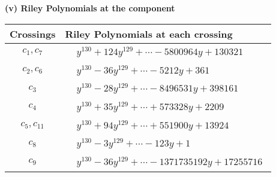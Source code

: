 \documentclass[1p]{elsarticle_modified}
\theoremstyle{definition}
\begin{document}
\newpage\renewcommand{\arraystretch}{1}
\flushleft \textbf{(v) Riley Polynomials at the component}\newline \\
\begin{tabular}{m{50pt}|m{274pt}}
Crossings & \hspace{64pt}Riley Polynomials at each crossing \\
\hline $$\begin{aligned}c_{1},c_{7}\end{aligned}$$&$\begin{aligned}
&y^{130}+124 y^{129}+\cdots-5800964 y+130321
\end{aligned}$\\
\hline $$\begin{aligned}c_{2},c_{6}\end{aligned}$$&$\begin{aligned}
&y^{130}-36 y^{129}+\cdots-5212 y+361
\end{aligned}$\\
\hline $$\begin{aligned}c_{3}\end{aligned}$$&$\begin{aligned}
&y^{130}-28 y^{129}+\cdots-8496531 y+398161
\end{aligned}$\\
\hline $$\begin{aligned}c_{4}\end{aligned}$$&$\begin{aligned}
&y^{130}+35 y^{129}+\cdots+573328 y+2209
\end{aligned}$\\
\hline $$\begin{aligned}c_{5},c_{11}\end{aligned}$$&$\begin{aligned}
&y^{130}+94 y^{129}+\cdots+551900 y+13924
\end{aligned}$\\
\hline $$\begin{aligned}c_{8}\end{aligned}$$&$\begin{aligned}
&y^{130}-3 y^{129}+\cdots-123 y+1
\end{aligned}$\\
\hline $$\begin{aligned}c_{9}\end{aligned}$$&$\begin{aligned}
&y^{130}-36 y^{129}+\cdots-1371735192 y+17255716
\end{aligned}$\\

\end{tabular}
\end{document}
